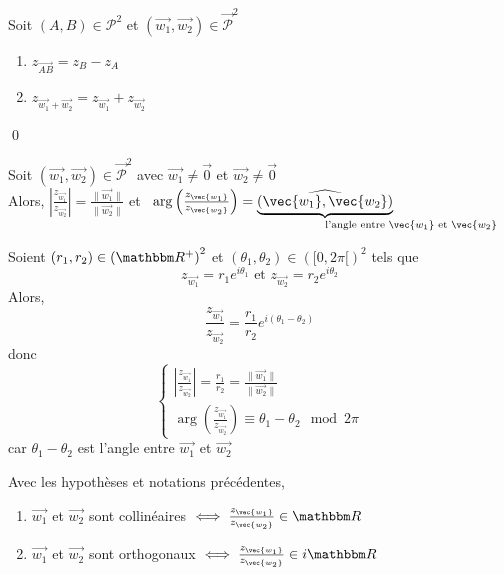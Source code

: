 \begin{prop}
	Soit $(A,B) \in \mathcal{P}^2$ et $(\vec{w_1}, \vec{w_2}) \in \vec{\mathcal{P}}^2$\\
	\begin{enumerate}
		\item $z_{\vec{AB}} = z_B - z_A$
		\item $z_{\vec{w_1} + \vec{w_2}} = z_{\vec{w_1}} + z_{\vec{w_2}}$
	\end{enumerate}
	\qed
\end{prop}

\begin{prop}
	Soit $(\vec{w_1}, \vec{w_2}) \in \vec{\mathcal{P}}^2$ avec $\vec{w_1} \neq \vec{0}$ et $\vec{w_2}\neq \vec{0}$\\
	Alors, $\left| \frac{z_{\vec{w_1}}}{z_{\vec{w_2}}} \right| = \frac{\|\vec{w_1}\|}{\|\vec{w_2}\|}$ et~ $\arg\left( \frac{z_{\vec{w_1}}}{z_{\vec{w_2}}} \right) = \underbrace{(\widehat{\vec{w_1}, \vec{w_2}})}_{\mathrlap{\text{l'angle entre } \vec{w_1} \text{ et } \vec{w_2}}}$
\end{prop}

\begin{prv}
	Soient $(r_1,r_2)\in \left( \R^+ \right) ^2$ et $(\theta_1,\theta_2)\in \left( [0, 2\pi[ \right) ^2$ tels que \[
		z_{\vec{w_1}} = r_1e^{i\theta_1} \text{ et }
		z_{\vec{w_2}} = r_2e^{i\theta_2}
	\] Alors, \[
	\frac{z_{\vec{w_1}}}{z_{\vec{w_2}}} = \frac{r_1}{r_2}e^{i\left( \theta_1-\theta_2 \right)}
	\] donc \[
		\begin{cases}
			\left| \frac{z_{\vec{w_1}}}{z_{\vec{w_2}}} \right| = \frac{r_1}{r_2} = \frac{\|\vec{w_1}\|}{\|\vec{w_2}\|}\\
			\arg\left( \frac{z_{\vec{w_1}}}{z_{\vec{w_2}}} \right) \equiv \theta_1 - \theta_2 \mod {2\pi}
		\end{cases}
	\] car $\theta_1-\theta_2$ est l'angle entre $\vec{w_1}$ et $\vec{w_2}$
\end{prv}

\begin{crlr}
	Avec les hypothèses et notations précédentes, 
	\begin{enumerate}
		\item $\vec{w_1}$ et $\vec{w_2}$ sont collinéaires $\iff \frac{z_{\vec{w_1}}}{z_{\vec{w_2}}} \in \R$
		\item $\vec{w_1}$ et $\vec{w_2}$ sont orthogonaux $\iff \frac{z_{\vec{w_1}}}{z_{\vec{w_2}}} \in i\R$
	\end{enumerate}
\end{crlr}

